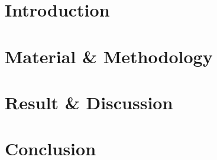 \documentclass[12pt]{report}
\begin{document}
\listoffigures
\clearpage

\listoftables
\clearpage

% 

\newpage
{}
\setcounter{page}{1}

\chapter{Introduction} \label{chap:introduction}



\chapter{Material \& Methodology} \label{chap:methodology}




\chapter{Result \& Discussion} \label{chap:result}


\chapter{Conclusion} \label{chap:conclusion}



\printbibliography
\end{document}
